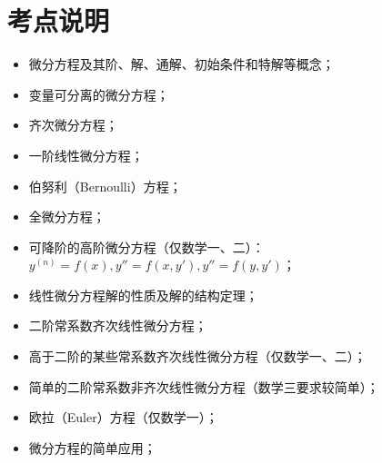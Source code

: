 \section{考点说明}
\begin{itemize}
\item 微分方程及其阶、解、通解、初始条件和特解等概念；
\item 变量可分离的微分方程；
\item 齐次微分方程；
\item 一阶线性微分方程；
\item 伯努利（Bernoulli）方程；
\item 全微分方程；
\item 可降阶的高阶微分方程（仅数学一、二）：$y^{(n)}=f(x), y''=f(x,y'), y''=f(y,y')$；
\item 线性微分方程解的性质及解的结构定理；
\item 二阶常系数齐次线性微分方程；
\item 高于二阶的某些常系数齐次线性微分方程（仅数学一、二）；
\item 简单的二阶常系数非齐次线性微分方程（数学三要求较简单）；
\item 欧拉（Euler）方程（仅数学一）；
\item 微分方程的简单应用；
\end{itemize}

